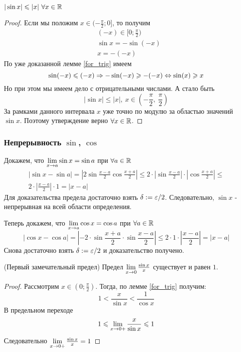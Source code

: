 \begin{corollary}
	$|\sin x| \leqslant |x|\ \forall x \in \mathbb{R}$
\end{corollary}

\begin{proof}
	Если мы положим $x \in (-\frac{\pi}{2}; 0]$, то получим
	\begin{align*}
		&(-x) \in [0; \frac{\pi}{2})
		\\
		&\sin x = -\sin (-x)
		\\
		&x = -(-x)
	\end{align*}
	По уже доказанной лемме \ref{for_trig} имеем
	\[
		\sin (-x) \leqslant (-x) \Rightarrow -\sin (-x) \geqslant -(-x) \Leftrightarrow \sin(x) \geqslant x
	\]
	Но при этом мы имеем дело с отрицательными числами. А стало быть
	\[
		|\sin x| \le |x|,\ x \in \left(-\frac{\pi}{2},\ \frac{\pi}{2}\right)
	\]
	За рамками данного интервала $x$ уже точно по модулю за областью значений $\sin x$. Поэтому утверждение верно $\forall x \in \mathbb{R}$.
\end{proof}

\subsubsection*{Непрерывность $\sin$, $\cos$}

Докажем, что $\lim\limits_{x \to a} \sin x = \sin a$ при $\forall a \in \mathbb{R}$
\begin{multline*}
	|\sin x - \sin a| = \left|2 \sin \frac{x - a}{2} \cos \frac{x + a}{2}\right| \le 2 \cdot \left|\sin \frac{x - a}{2}\right| \cdot \left|\cos \frac{x + a}{2}\right| \le \\
	2 \cdot \left|\frac{x - a}{2}\right| \cdot 1 = |x - a|
\end{multline*}
Для доказательства предела достаточно взять $\delta := \varepsilon / 2$. Следовательно, $\sin x$ - непрерывная на всей области определения.

Теперь докажем, что $\lim\limits_{x \to a} \cos x = \cos a$ при $\forall a \in \mathbb{R}$
\[
	|\cos x - \cos a| = \left|-2 \cdot \sin \frac{x + a}{2} \cdot \sin \frac{x - a}{2} \right| \le 2 \cdot 1 \cdot \left|\frac{x - a}{2}\right| = |x - a|
\]
Снова достаточно взять $\delta := \varepsilon / 2$ и доказательство получено.


\begin{theorem} (Первый замечательный предел) Предел $\lim\limits_{x \to 0} \frac{\sin x}{x}$ существует и равен $1$.
\end{theorem}

\begin{proof}
	Рассмотрим $x \in (0; \frac{\pi}{2})$. Тогда, по лемме \ref{for_trig} получим:
	$$
		1 < \frac{x}{\sin x} < \frac{1}{\cos x}
	$$
	В предельном переходе
	$$
		1 \leqslant \lim\limits_{x \to 0+} \frac{x}{\sin x} \leqslant 1
	$$
	Следовательно $\lim\limits_{x \to 0+} \frac{\sin x}{x} = 1$
\end{proof}

